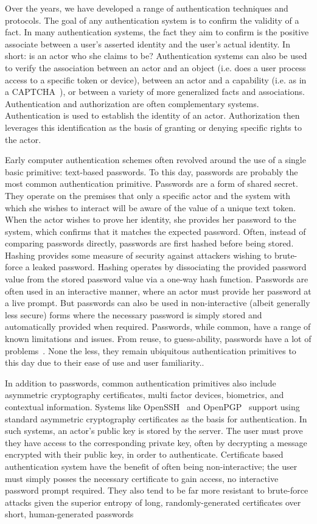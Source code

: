 Over the years, we have developed a range of authentication techniques
and protocols. The goal of any authentication system is to confirm the
validity of a fact. In many authentication systems, the fact they aim
to confirm is the positive associate between a user's asserted
identity and the user's actual identity. In short: is an actor who she
claims to be? Authentication systems can also be used to verify the
association between an actor and an object (i.e. does a user process
access to a specific token or device), between an actor and a
capability (i.e. as in a CAPTCHA~\cite{captcha}), or between a variety
of more generalized facts and associations. Authentication and
authorization are often complementary systems. Authentication is used
to establish the identity of an actor. Authorization then leverages
this identification as the basis of granting or denying specific
rights to the actor.

Early computer authentication schemes often revolved around the use of
a single basic primitive: text-based passwords. To this day, passwords
are probably the most common authentication primitive. Passwords are a
form of shared secret. They operate on the premises that only a
specific actor and the system with which she wishes to interact will
be aware of the value of a unique text token. When the actor wishes to
prove her identity, she provides her password to the system, which
confirms that it matches the expected password. Often, instead of
comparing passwords directly, passwords are first hashed before being
stored. Hashing provides some measure of security against attackers
wishing to brute-force a leaked password. Hashing operates by
dissociating the provided password value from the stored password
value via a one-way hash function. Passwords are often used in an
interactive manner, where an actor must provide her password at a live
prompt. But passwords can also be used in non-interactive (albeit
generally less secure) forms where the necessary password is simply
stored and automatically provided when required. Passwords, while
common, have a range of known limitations and issues. From reuse, to
guess-ability, passwords have a lot of
problems~\cite{Singer2013, goodin-passwords, goodin-bible}. None
the less, they remain ubiquitous authentication primitives to this day
due to their ease of use and user familiarity..

In addition to passwords, common authentication primitives also
include asymmetric cryptography certificates, multi factor devices,
biometrics, and contextual information. Systems like
OpenSSH~\cite{openSSH} and OpenPGP~\cite{openpgp} support using
standard asymmetric cryptography certificates as the basis for
authentication. In such systems, an actor's public key is stored by
the server. The user must prove they have access to the corresponding
private key, often by decrypting a message encrypted with their public
key, in order to authenticate. Certificate based authentication system
have the benefit of often being non-interactive; the user must simply
posses the necessary certificate to gain access, no interactive
password prompt required. They also tend to be far more resistant to
brute-force attacks given the superior entropy of long,
randomly-generated certificates over short, human-generated passwords

